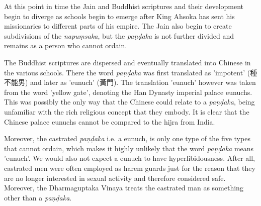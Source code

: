 At this point in time the Jain and Buddhist scriptures and their development begin to diverge as schools begin to emerge after King Ahsoka has sent his missionaries to different parts of his empire. The Jain also begin to create subdivisions of the {\em napuṃsaka}, but the {\em paṇḍaka} is not further divided and remains as a person who cannot ordain. 

The Buddhist scriptures are dispersed and eventually translated into Chinese in the various schools. There the word {\em paṇḍaka} was first translated as 'impotent' (種不能男) and later as 'eunuch' (黃門). The translation 'eunuch' however was taken from the word 'yellow gate', denoting the Han Dynasty imperial palace eunuchs. This was possibly the only way that the Chinese could relate to a {\em paṇḍaka}, being unfamiliar with the rich religious concept that they embody. It is clear that the Chinese palace eunuchs cannot be compared to the hijra from India.

\begin{figure}[!tbp]
  \centering
  \hfill
\end{figure}

Moreover, the castrated {\em paṇḍaka} i.e. a eunuch, is only one type of the five types that cannot ordain, which makes it highly unlikely that the word {\em paṇḍaka} means 'eunuch'. We would also not expect a eunuch to have hyperlibidousness. After all, castrated men were often employed as harem guards just for the reason that they are no longer interested in sexual activity and therefore considered safe. Moreover, the Dharmaguptaka Vinaya treats the castrated man as something other than a {\em paṇḍaka}.

